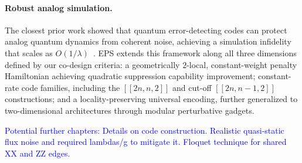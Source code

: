 \documentclass[%
10pt,tightenlines,
superscriptaddress,
 amsmath,amssymb,
 aps,
pra,
]{revtex4-2}
\newcommand{\sy}[1]{\textcolor{blue}{#1}}
\begin{document}
\paragraph{Robust analog simulation.}
The closest prior work showed that quantum error-detecting codes can protect analog quantum dynamics from coherent noise, achieving a simulation infidelity that scales as $O(1/\lambda)$~\cite{cao2024robust}. EPS extends this framework along all three dimensions defined by our co-design criteria: a geometrically $2$-local, constant-weight penalty Hamiltonian achieving quadratic suppression capability improvement; constant-rate code families, including the $[[2n,n,2]]$ and cut-off $[[2n,n-1,2]]$ constructions; and a locality-preserving universal encoding, further generalized to two-dimensional architectures through modular perturbative gadgets.


\sy{Potential further chapters: Details on code construction. Realistic quasi-static flux noise and required lambdas/g to mitigate it. Floquet technique for shared XX and ZZ edges.}
\end{document}
